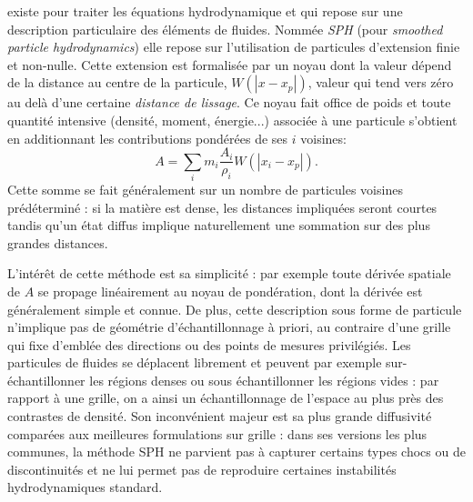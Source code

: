  existe pour traiter les équations hydrodynamique et qui repose sur une description particulaire des éléments de fluides. Nommée \textit{SPH} (pour \textit{smoothed particle hydrodynamics}) elle repose sur l'utilisation de particules d'extension finie et non-nulle. Cette extension est formalisée par un noyau dont la valeur dépend de la distance au centre de la particule, $W(|x-x_p|)$, valeur qui tend vers zéro au delà d'une certaine \textit{distance de lissage}. Ce noyau fait office de poids et toute quantité intensive (densité, moment, énergie...) associée à une particule s'obtient en additionnant les contributions pondérées de ses $i$ voisines:
\begin{equation}
A=\sum_i m_i \frac{A_i}{\rho_i} W(|x_i-x_p|).
\end{equation} 
Cette somme se fait généralement sur un nombre de particules voisines prédéterminé : si la matière est dense, les distances impliquées seront courtes tandis qu'un état diffus implique naturellement une sommation sur des plus grandes distances.
 
L'intérêt de cette méthode est sa simplicité : par exemple toute dérivée spatiale de $A$ se propage linéairement au noyau de pondération, dont la dérivée est généralement simple et connue. De plus, cette description sous forme de particule n'implique pas de géométrie d'échantillonnage à priori, au contraire d'une grille qui fixe d'emblée des directions ou des points de mesures privilégiés. Les particules de fluides se déplacent librement et peuvent par exemple sur-échantillonner les régions denses ou sous échantillonner les régions vides : par rapport à une grille, on a ainsi un échantillonnage de l'espace au plus près des contrastes de densité. Son inconvénient majeur est sa plus grande diffusivité comparées aux meilleures formulations sur grille : dans ses versions les plus communes, la méthode SPH ne parvient pas à capturer certains types chocs ou de discontinuités et ne lui permet pas de reproduire certaines instabilités hydrodynamiques standard. 

